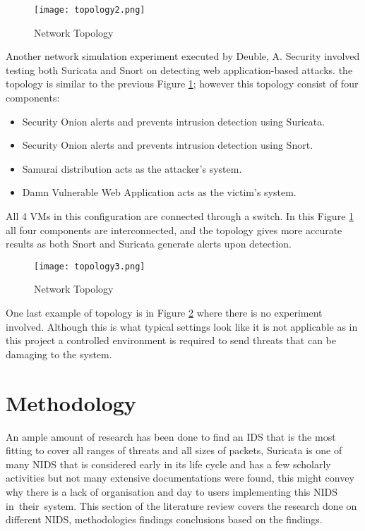 \documentclass[12pt]{article}
\begin{document}
		\begin{center}
			\begin{figure}[H]
				\centering
				\texttt{[image: topology2.png]}
				\caption{Network Topology \cite{deuble_2012_detecting}}
				\label{fig:topology2}
			\end{figure}
		\end{center}
		Another network simulation experiment executed by Deuble, A. Security involved testing both Suricata and Snort on detecting web application-based attacks. the topology  is similar to the previous Figure \ref{fig:topology2}; however this topology consist of four components:  \cite{deuble_2012_detecting}
		
		
		
		\begin{itemize}
			\item Security Onion alerts and prevents intrusion detection using Suricata.
			\item Security Onion alerts and prevents intrusion detection using Snort.
			\item Samurai distribution acts as the attacker's system.
			\item Damn Vulnerable Web Application acts as the victim's system.
		\end{itemize}
		All 4 VMs in this configuration are connected through a switch. 
		In this Figure \ref{fig:topology2} all four components are interconnected, and the topology gives more accurate results as both Snort and Suricata generate alerts upon detection. 
		
		
		
		
		\begin{center}
			\begin{figure}[H]
				\centering
				\texttt{[image: topology3.png]}
				\caption{Network Topology \cite{park_2016_performance}}
				\label{fig:topology3}
			\end{figure}
		\end{center}
		One last example of topology is in Figure \ref{fig:topology3} where there is no experiment involved. Although this is what typical settings look like it is not applicable as in this project a controlled environment is required to send threats that can be damaging to the system.
		
		
		\section{Methodology}\label{1}
		An ample amount of research has been done to find an IDS that is the most fitting to cover all ranges of threats and all sizes of packets, Suricata is one of many NIDS that is considered early in its life cycle and has a few scholarly activities but not many extensive documentations were found, this might convey why there is a lack of organisation and day to users implementing this NIDS in their system. 
		This section of the literature review covers the research done on different NIDS, methodologies findings conclusions based on the findings.
		
\end{document}
